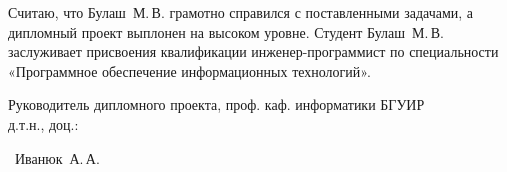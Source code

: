 {Считаю, что Булаш~М.\,В. грамотно справился с поставленными задачами, а дипломный проект выплонен на высоком уровне. Студент Булаш~М.\,В. заслуживает присвоения квалификации инженер-программист по специальности «Программное обеспечение информационных технологий».

  \vfill
  \noindent
  \begin{minipage}{0.54\textwidth}
    \begin{flushleft}
      Руководитель дипломного проекта,
      проф. каф. информатики БГУИР \\
      д.т.н., доц.:\\
    \end{flushleft}
  \end{minipage}
  \begin{minipage}{0.44\textwidth}
    \begin{flushright}
      \underline{\hspace*{3cm}}~Иванюк~А.\,А.
    \end{flushright}
  \end{minipage}
}

\clearpage
